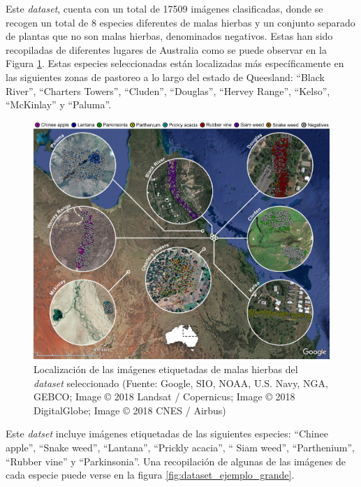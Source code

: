Este \textit{dataset}, cuenta con un total de 17509 imágenes clasificadas, donde se recogen un total de 8 especies diferentes de malas hierbas y un conjunto separado de plantas que no son malas hierbas, denominados negativos. Estas han sido recopiladas de diferentes lugares de Australia como se puede observar en la Figura \ref{fig:loc_malas_hierbas}. Estas especies seleccionadas están localizadas más específicamente en las siguientes zonas de pastoreo a lo largo del estado de Queesland: ``Black River'', ``Charters Towers'', ``Cluden'', ``Douglas'', ``Hervey Range'', ``Kelso'', ``McKinlay'' y ``Paluma''.

\begin{figure}[ht]
    \centering
    \includegraphics[width=\textwidth]{figuras/problema/localizacion_malas_hierbas.jpg}
    \caption{Localización de las imágenes etiquetadas de malas hierbas del \textit{dataset} seleccionado (Fuente: Google, SIO, NOAA, U.S. Navy, NGA, GEBCO; Image © 2018 Landsat / Copernicus; Image © 2018 DigitalGlobe; Image © 2018 CNES / Airbus)}
    \label{fig:loc_malas_hierbas}
\end{figure}

Este \textit{datset} incluye imágenes etiquetadas de las siguientes especies: ``Chinee apple'', ``Snake weed'', ``Lantana'', ``Prickly acacia'', `` Siam weed'', ``Parthenium'', ``Rubber vine'' y ``Parkinsonia''. Una recopilación de algunas de las imágenes de cada especie puede verse en la figura \ref{fig:dataset_ejemplo_grande}.

